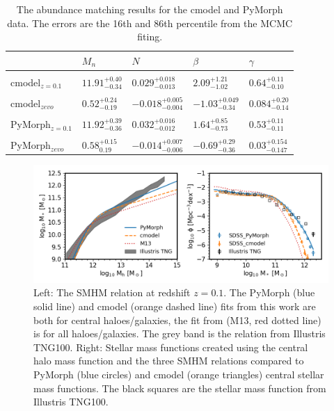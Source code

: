\begin{table}
\centering
\begin{tabular}{l||llll}
        & $M_n$ & $N$     & $\beta$ & $\gamma$ \\ \hline
\\
cmodel$_{z=0.1}$ & $11.91_{-0.34}^{+0.40}$ & $0.029_{-0.013}^{+0.018}$ & $2.09_{-1.02}^{+1.21}$    & $0.64_{-0.10}^{+0.11}$     \\
\\ 
cmodel$_{zevo}$ & $0.52_{-0.19}^{+0.24}$       & $-0.018_{-0.004}^{+0.005}$ & $-1.03_{-0.34}^{+0.049}$     & $0.084_{-0.14}^{+0.20}$      \\
\\
PyMorph$_{z=0.1}$ & $11.92_{-0.36}^{+0.39}$ & $0.032_{-0.012}^{+0.016}$ & $1.64_{-0.73}^{+0.85}$     & $0.53_{-0.11}^{+0.11}$     \\
\\ 
PyMorph$_{zevo}$ & $0.58_{0.19}^{+0.15}$        & $-0.014_{-0.006}^{+0.007}$ & $-0.69_{-0.36}^{+0.29}$      & $0.03_{-0.147}^{+0.154}$   
\end{tabular}
\caption{The abundance matching results for the cmodel and PyMorph data. The errors are the 16th and 86th percentile from the MCMC fiting.}
\label{tab:AbnResult}
\end{table}

\begin{figure}[h]
    \centering
    \includegraphics[width = \linewidth]{Figures/Chapter2/AbundaceMtch_Data.png}
    \caption{Left: The SMHM relation at redshift $z=0.1$. The PyMorph (blue solid line) and cmodel (orange dashed line) fits from this work are both for central haloes/galaxies, the fit from \citet{Moster2013} (M13, red dotted line) is for all haloes/galaxies. The grey band is the relation from Illustris TNG100. Right: Stellar mass functions created using the central halo mass function and the three SMHM relations compared to PyMorph (blue circles) and cmodel (orange triangles) central stellar mass functions. The black squares are the stellar mass function from Illustris TNG100.}
    \label{fig:Abn_Data}
\end{figure}

